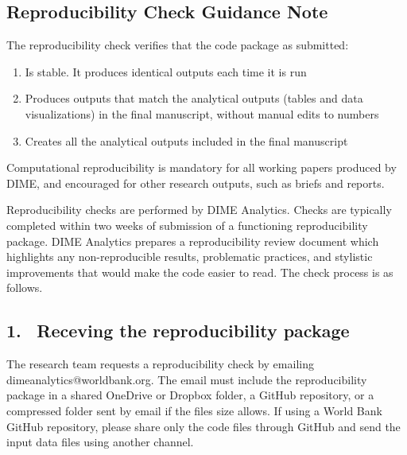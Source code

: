 


	\begin{fullwidth}


	\section*{Reproducibility Check Guidance Note}

The reproducibility check verifies that the code package as submitted:

	\begin{enumerate}
		\setlength\itemsep{-0.1em}
		\item Is stable. It produces identical outputs each time it is run
		\item Produces outputs that match the analytical outputs (tables and data visualizations) in the final manuscript, without manual edits to numbers
		\item Creates all the analytical outputs included in the final manuscript
	\end{enumerate}

	Computational reproducibility is mandatory for all working papers produced by DIME, and encouraged for other research outputs, such as briefs and reports. 

	Reproducibility checks are performed by DIME Analytics. Checks are typically completed within two weeks of submission of a functioning reproducibility package. DIME Analytics prepares a reproducibility review document which highlights any non-reproducible results, problematic practices, and stylistic improvements that would make the code easier to read. The check process is as follows.

	\subsection{1. \, Receving the reproducibility package}

	The research team requests a reproducibility check by emailing dimeanalytics@worldbank.org. The email must include the reproducibility package in a shared OneDrive or Dropbox folder, a GitHub repository, or a compressed folder sent by email if the files size allows. If using a World Bank GitHub repository, please share only the code files through GitHub and send the input data files using another channel. 
	

\end{fullwidth}

